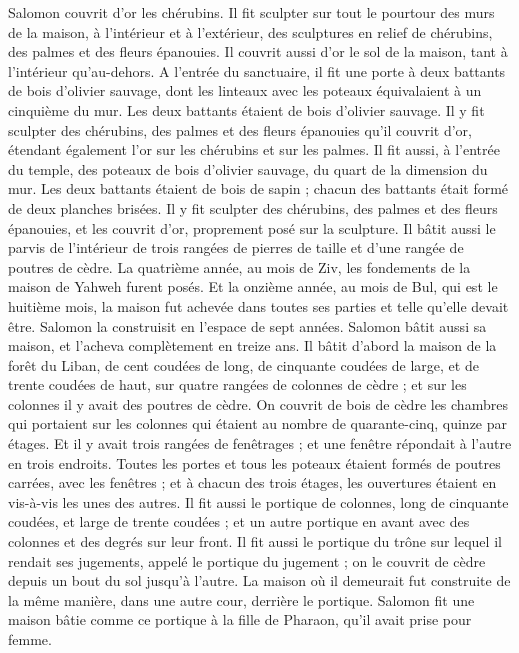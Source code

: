 \begin{multicols}{2}
Salomon couvrit d'or les chérubins.
Il fit sculpter sur tout le pourtour des murs de la maison, à l’intérieur et à l’extérieur, des sculptures en relief de chérubins, des palmes et des fleurs épanouies.
Il couvrit aussi d'or le sol de la maison, tant à l’intérieur qu’au-dehors.
A l'entrée du sanctuaire, il fit une porte à deux battants de bois d'olivier sauvage, dont les linteaux avec les poteaux équivalaient à un cinquième du mur.
Les deux battants étaient de bois d'olivier sauvage. Il y fit sculpter des chérubins, des palmes et des fleurs épanouies qu’il couvrit d'or, étendant également l'or sur les chérubins et sur les palmes.
Il fit aussi, à l'entrée du temple, des poteaux de bois d'olivier sauvage, du quart de la dimension du mur.
Les deux battants étaient de bois de sapin ; chacun des battants était formé de deux planches brisées.
Il y fit sculpter des chérubins, des palmes et des fleurs épanouies, et les couvrit d'or, proprement posé sur la sculpture.
Il bâtit aussi le parvis de l’intérieur de trois rangées de pierres de taille et d'une rangée de poutres de cèdre.
La quatrième année, au mois de Ziv, les fondements de la maison de Yahweh furent posés.
Et la onzième année, au mois de Bul, qui est le huitième mois, la maison fut achevée dans toutes ses parties et telle qu’elle devait être. Salomon la construisit en l’espace de sept années.
\VerseOne{}Salomon bâtit aussi sa maison, et l'acheva complètement en treize ans.
Il bâtit d’abord la maison de la forêt du Liban, de cent coudées de long, de cinquante coudées de large, et de trente coudées de haut, sur quatre rangées de colonnes de cèdre ; et sur les colonnes il y avait des poutres de cèdre.
On couvrit de bois de cèdre les chambres qui portaient sur les colonnes qui étaient au nombre de quarante-cinq, quinze par étages.
Et il y avait trois rangées de fenêtrages ; et une fenêtre répondait à l'autre en trois endroits.
Toutes les portes et tous les poteaux étaient formés de poutres carrées, avec les fenêtres ; et à chacun des trois étages, les ouvertures étaient en vis-à-vis les unes des autres.
Il fit aussi le portique de colonnes, long de cinquante coudées, et large de trente coudées ; et un autre portique en avant avec des colonnes et des degrés sur leur front.
Il fit aussi le portique du trône sur lequel il rendait ses jugements, appelé le portique du jugement ; on le couvrit de cèdre depuis un bout du sol jusqu'à l'autre.
La maison où il demeurait fut construite de la même manière, dans une autre cour, derrière le portique. Salomon fit une maison bâtie comme ce portique à la fille de Pharaon, qu'il avait prise pour femme.

\end{multicols}
